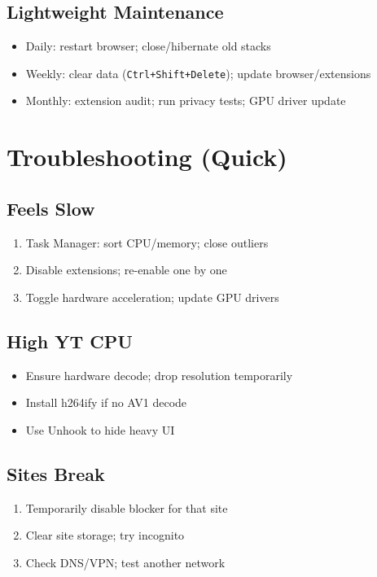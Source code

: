 \documentclass[10pt,a4paper,oneside]{book}
\newcommand{\keystroke}[1]{\texttt{\color{accentred}#1}}
\begin{document}
\section{Lightweight Maintenance}
\begin{itemize}
  \item Daily: restart browser; close/hibernate old stacks
  \item Weekly: clear data (\keystroke{Ctrl+Shift+Delete}); update browser/extensions
  \item Monthly: extension audit; run privacy tests; GPU driver update
\end{itemize}

\chapter{Troubleshooting (Quick)}
\section{Feels Slow}
\begin{enumerate}
  \item Task Manager: sort CPU/memory; close outliers
  \item Disable extensions; re-enable one by one
  \item Toggle hardware acceleration; update GPU drivers
\end{enumerate}

\section{High YT CPU}
\begin{itemize}
  \item Ensure hardware decode; drop resolution temporarily
  \item Install h264ify if no AV1 decode
  \item Use Unhook to hide heavy UI
\end{itemize}

\section{Sites Break}
\begin{enumerate}
  \item Temporarily disable blocker for that site
  \item Clear site storage; try incognito
  \item Check DNS/VPN; test another network
\end{enumerate}
\end{document}
